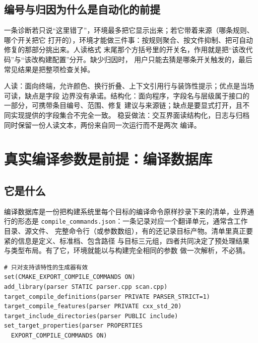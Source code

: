 \documentclass[12pt,a4paper,fontset=fandol]{ctexbook}
\newcommand{\Bk}{\discretionary{}{}{}}
\newcommand{\Sym}[1]{\texttt{#1}}
\begin{document}
\subsection{编号与归因为什么是自动化的前提}\label{sec:cl14-diag-code}

一条诊断若只说“这里错了”，环境最多把它显示出来；若它带着来源（哪条规则、哪个开关把它
打开的），环境才能做三件事：按规则聚合、按文件抑制、把可自动修复的那部分挑出来。人读格式
末尾那个方括号里的开关名，作用就是把“该改代码”与“该改构建配置”分开。缺少归因时，
用户只能去猜是哪条开关触发的，最后常见结果是把整项检查关掉。

\begin{compare}[title={人读格式与结构化输出}]
人读：面向终端，允许颜色、换行折叠、上下文引用行与装饰性提示；优点是当场可读，缺点是字段
边界没有承诺。结构化：面向程序，字段名与层级属于接口的一部分，可携带条目编号、范围、修复
建议与来源链；缺点是要显式打开，且不同实现提供的字段集合不完全一致。
稳妥做法：交互界面读结构化，日志与归档同时保留一份人读文本，两份来自同一次运行而不是两次
编译。
\end{compare}

\section{真实编译参数是前提：编译数据库}\label{sec:cl14-compdb}

\subsection{它是什么}\label{sec:cl14-compdb-what}

编译数据库是一份把构建系统里每个目标的编译命令原样抄录下来的清单，业界通行的形态是
\Sym{compile{\Bk}\_commands{\Bk}.json}：一条记录对应一个翻译单元，通常含工作目录、源文件、
完整命令行（或参数数组），有的还记录目标产物。清单里真正要紧的信息是定义、标准档、包含路径
与目标三元组，四者共同决定了预处理结果与类型布局。有了它，环境就能以与构建完全相同的参数
做一次解析，不必猜。

\begin{lstlisting}[style=cmakestyle, caption={导出编译数据库：变量与目标属性两条入口}]
# 只对支持该特性的生成器有效
set(CMAKE_EXPORT_COMPILE_COMMANDS ON)
add_library(parser STATIC parser.cpp scan.cpp)
target_compile_definitions(parser PRIVATE PARSER_STRICT=1)
target_compile_features(parser PRIVATE cxx_std_20)
target_include_directories(parser PUBLIC include)
set_target_properties(parser PROPERTIES
  EXPORT_COMPILE_COMMANDS ON)
\end{lstlisting}
\end{document}
